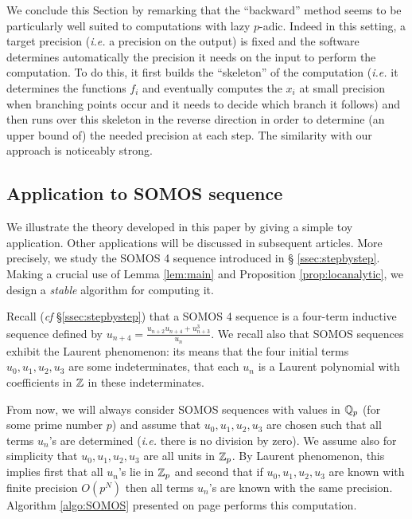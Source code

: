 \documentclass{lms}
\begin{document}
We conclude this Section by remarking that the ``backward'' method seems 
to be particularly well suited to computations with lazy $p$-adic. Indeed 
in this setting, a target precision (\emph{i.e.} a precision on the 
output) is fixed and the software determines automatically the precision 
it needs on the input to perform the computation. To do this, it first 
builds the ``skeleton'' of the computation (\emph{i.e.} it determines the 
functions $f_i$ and eventually computes the $x_i$ at small precision when 
branching points occur and it needs to decide which branch it follows) 
and then runs over this skeleton in the reverse direction in order to 
determine (an upper bound of) the needed precision at each step. The 
similarity with our approach is noticeably strong.

\subsection{Application to SOMOS sequence}
\label{ssec:SOMOS-solution}

We illustrate the theory developed in this paper by giving a simple 
toy application. Other applications will be discussed in subsequent 
articles. More precisely, we study the SOMOS 4 sequence introduced in \S 
\ref{ssec:stepbystep}. Making a crucial use of Lemma \ref{lem:main} and 
Proposition \ref{prop:locanalytic}, we design a \emph{stable} algorithm 
for computing it.

Recall (\emph{cf} \S \ref{ssec:stepbystep}) that a SOMOS 4 sequence is a 
four-term inductive sequence defined by $u_{n+4} = \frac{u_{n+2} u_{n+4} 
+ u_{n+3}^3}{u_n}$. We recall also that SOMOS sequences exhibit the 
Laurent phenomenon: its means that the four initial terms $u_0, u_1, 
u_2, u_3$ are some indeterminates, that each $u_n$ is a Laurent 
polynomial with coefficients in $\mathbb Z$ in these indeterminates.

From now, we will always consider SOMOS sequences with values in $\mathbb Q_p$ 
(for some prime number $p$) and assume that $u_0, u_1, u_2, u_3$ are 
chosen such that all terms $u_n$'s are determined (\emph{i.e.} there is 
no division by zero). We assume also for simplicity that $u_0, u_1, u_2, 
u_3$ are all units in $\mathbb Z_p$. By Laurent phenomenon, this implies first 
that all $u_n$'s lie in $\mathbb Z_p$ and second that if $u_0, u_1, u_2, u_3$ 
are known with finite precision $O(p^N)$ then all terms $u_n$'s are 
known with the same precision. Algorithm \ref{algo:SOMOS} presented on 
page \pageref{algo:SOMOS} performs this computation.
\end{document}
